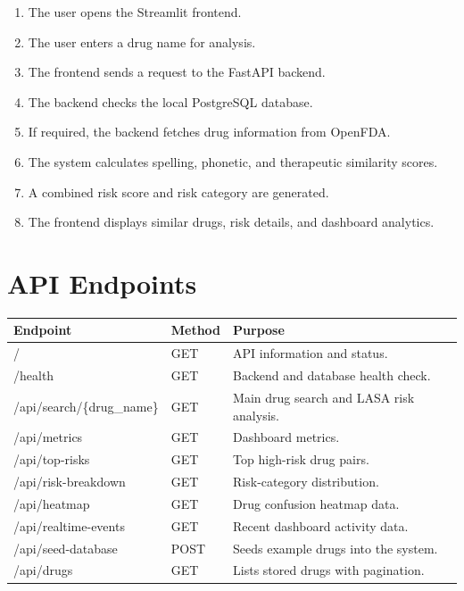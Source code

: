 \documentclass[12pt,a4paper]{article}
\begin{document}
\begin{enumerate}[leftmargin=1.4cm]
    \item The user opens the Streamlit frontend.
    \item The user enters a drug name for analysis.
    \item The frontend sends a request to the FastAPI backend.
    \item The backend checks the local PostgreSQL database.
    \item If required, the backend fetches drug information from OpenFDA.
    \item The system calculates spelling, phonetic, and therapeutic similarity scores.
    \item A combined risk score and risk category are generated.
    \item The frontend displays similar drugs, risk details, and dashboard analytics.
\end{enumerate}

\section{API Endpoints}

\begin{table}[h!]
\centering
{}
\begin{tabularx}{\textwidth}{p{4.8cm}p{2.0cm}Y}
\toprule
{}
\textbf{Endpoint} & \textbf{Method} & \textbf{Purpose} \\
\midrule
/ & GET & API information and status. \\
/health & GET & Backend and database health check. \\
/api/search/\{drug\_name\} & GET & Main drug search and LASA risk analysis. \\
/api/metrics & GET & Dashboard metrics. \\
/api/top-risks & GET & Top high-risk drug pairs. \\
/api/risk-breakdown & GET & Risk-category distribution. \\
/api/heatmap & GET & Drug confusion heatmap data. \\
/api/realtime-events & GET & Recent dashboard activity data. \\
/api/seed-database & POST & Seeds example drugs into the system. \\
/api/drugs & GET & Lists stored drugs with pagination. \\
\bottomrule
\end{tabularx}
\end{table}
\end{document}
